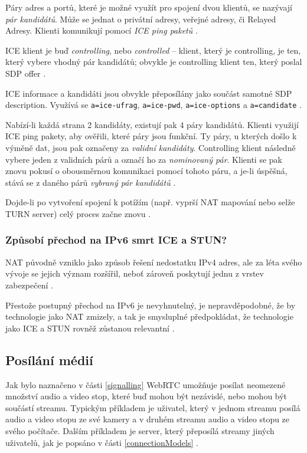 Páry adres a portů, které je možné využít pro spojení dvou klientů, se nazývají
\textit{pár kandidátů}. Může se jednat o privátní adresy, veřejné adresy, či
Relayed Adresy. Klienti komunikují pomocí \textit{ICE ping paketů}
\cite{WebRTCForTheCurious}.

ICE klient je buď \textit{controlling}, nebo \textit{controlled} -- klient,
který je controlling, je ten, který vybere vhodný pár kandidátů; obvykle je
controlling klient ten, který poslal SDP offer \cite{WebRTCForTheCurious}.

ICE informace a kandidáti jsou obvykle přeposílány jako součást samotné SDP
description. Využívá se \texttt{a=ice-ufrag},
\texttt{a=ice-pwd}, \texttt{a=ice-options} a
\texttt{a=candidate} \cite{WebRTCForTheCurious}.

Nabízí-li každá strana 2 kandidáty, existují pak 4 páry kandidátů. Klienti
využijí ICE ping pakety, aby ověřili, které páry jsou funkční. Ty páry, u
kterých došlo k výměně dat, jsou pak označeny za \textit{validní kandidáty}.
Controlling klient následně vybere jeden z validních párů a označí ho za
\textit{nominovaný pár}. Klienti se pak znovu pokusí o obousměrnou komunikaci
pomocí tohoto páru, a je-li úspěšná, stává se z daného párů \textit{vybraný pár
	kandidátů} \cite{WebRTCForTheCurious}.

Dojde-li po vytvoření spojení k potížím (např. vyprší NAT mapování nebo selže
TURN server) celý proces začne znovu \cite{WebRTCForTheCurious}.

\subsubsection{Způsobí přechod na IPv6 smrt ICE a STUN?}

NAT původně vzniklo jako způsob řešení nedostatku IPv4 adres, ale za léta svého
vývoje se jejich význam rozšířil, neboť zároveň poskytují jednu z vrstev
zabezpečení \cite{Quora-WillIPv6KillSTUNAndICE}.

Přestože postupný přechod na IPv6 je nevyhnutelný, je nepravděpodobné, že by
technologie jako NAT zmizely, a tak je smysluplné předpokládat, že technologie
jako ICE a STUN rovněž zůstanou relevantní \cite{Quora-WillIPv6KillSTUNAndICE}.

\subsection{Posílání médií}

Jak bylo naznačeno v části \ref{signalling} WebRTC umožňuje posílat neomezené
množství audio a video stop, které buď mohou být nezávislé, nebo mohou být
součástí streamu. Typickým příkladem je uživatel, který v jednom streamu posílá
audio a video stopu ze své kamery a v druhém streamu audio a video stopu ze
svého počítače. Dalším příkladem je server, který přeposílá streamy jiných
uživatelů, jak je popsáno v části \ref{connectionModels}
\cite{WebRTCForTheCurious}.

